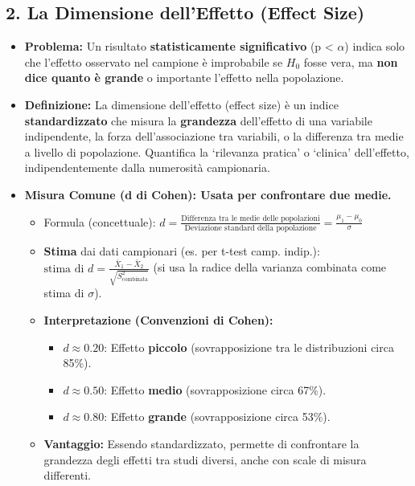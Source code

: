 \documentclass[12pt, a4paper]{article}
\newcommand{\samplemean}{\bar{X}}
\newcommand{\popsd}{\sigma}
\newcommand{\alphaerr}{\alpha} %
\newcommand{\Hnull}{H_0} %
\newcommand{\cohend}{d} %
\newcommand{\Spool}{S^2_{\text{combinata}}} %
\begin{document}
\subsection*{2. La Dimensione dell'Effetto (Effect Size)}
\begin{itemize}
    \item \textbf{Problema:} Un risultato \textbf{statisticamente significativo} (p < $\alphaerr$) indica solo che l'effetto osservato nel campione è improbabile se $\Hnull$ fosse vera, ma \textbf{non dice quanto è grande} o importante l'effetto nella popolazione.
    \item \textbf{Definizione:} La dimensione dell'effetto (effect size) è un indice \textbf{standardizzato} che misura la \textbf{grandezza} dell'effetto di una variabile indipendente, la forza dell'associazione tra variabili, o la differenza tra medie a livello di popolazione. Quantifica la `rilevanza pratica' o `clinica' dell'effetto, indipendentemente dalla numerosità campionaria.
    \item \textbf{Misura Comune (d di Cohen): Usata per confrontare due medie.}
        \begin{itemize}
            \item Formula (concettuale): $\cohend = \frac{\text{Differenza tra le medie delle popolazioni}}{\text{Deviazione standard della popolazione}} = \frac{\mu_1 - \mu_0}{\popsd}$
            \item \textbf{Stima} dai dati campionari (es. per t-test camp. indip.): $\text{stima di } \cohend = \frac{\samplemean_1 - \samplemean_2}{\sqrt{\Spool}}$ (si usa la radice della varianza combinata come stima di $\popsd$).
            \item \textbf{Interpretazione (Convenzioni di Cohen):}
                \begin{itemize}
                    \item $d \approx 0.20$: Effetto \textbf{piccolo} (sovrapposizione tra le distribuzioni circa 85\%).
                    \item $d \approx 0.50$: Effetto \textbf{medio} (sovrapposizione circa 67\%).
                    \item $d \approx 0.80$: Effetto \textbf{grande} (sovrapposizione circa 53\%).
                \end{itemize}
            \item \textbf{Vantaggio:} Essendo standardizzato, permette di confrontare la grandezza degli effetti tra studi diversi, anche con scale di misura differenti. 
        \end{itemize}
\end{itemize}
\end{document}
